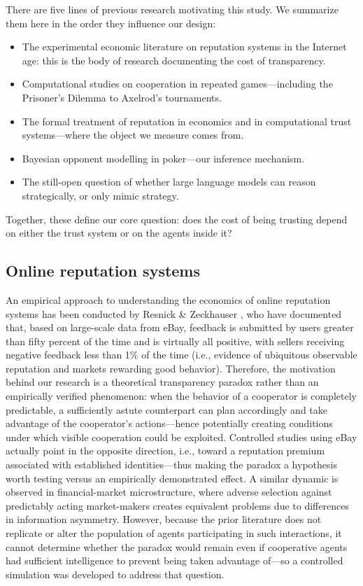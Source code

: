 \documentclass[10pt,twocolumn,letterpaper]{article}
\begin{document}
There are five lines of previous research motivating this study. We
summarize them here in the order they influence our design:
\begin{itemize}\itemsep2pt
  \item The experimental economic literature on reputation systems in
  the Internet age: this is the body of research documenting the cost
  of transparency.
  \item Computational studies on cooperation in repeated
  games---including the Prisoner's Dilemma to Axelrod's tournaments.
  \item The formal treatment of reputation in economics and in
  computational trust systems---where the object we measure comes from.
  \item Bayesian opponent modelling in poker---our inference mechanism.
  \item The still-open question of whether large language models can
  reason strategically, or only mimic strategy.
\end{itemize}
Together, these define our core question: does the cost of being
trusting depend on either the trust system or on the agents inside
it?

\subsection{Online reputation systems}
An empirical approach to understanding the economics of online
reputation systems has been conducted by Resnick \& Zeckhauser
\citep{resnick2002trust}, who have documented that, based on
large-scale data from eBay, feedback is submitted by users greater
than fifty percent of the time and is virtually all positive, with
sellers receiving negative feedback less than 1\% of the time (i.e.,
evidence of ubiquitous observable reputation and markets rewarding
good behavior). Therefore, the motivation behind our research is a
theoretical transparency paradox rather than an empirically verified
phenomenon: when the behavior of a cooperator is completely
predictable, a sufficiently astute counterpart can plan accordingly
and take advantage of the cooperator's actions---hence potentially
creating conditions under which visible cooperation could be
exploited. Controlled studies using eBay actually point in the
opposite direction, i.e., toward a reputation premium associated with
established identities---thus making the paradox a hypothesis worth
testing versus an empirically demonstrated effect. A similar dynamic
is observed in financial-market microstructure, where adverse
selection against predictably acting market-makers
\citep{glosten1985bid} creates equivalent problems due to differences
in information asymmetry. However, because the prior literature does
not replicate or alter the population of agents participating in such
interactions, it cannot determine whether the paradox would remain
even if cooperative agents had sufficient intelligence to prevent
being taken advantage of---so a controlled simulation was developed
to address that question.
\end{document}
